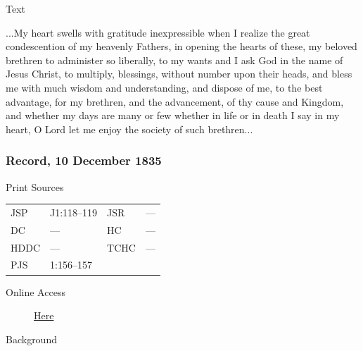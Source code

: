 			\begin{description}
				\item[Text]
			\end{description}
			
				...My heart swells with gratitude inexpressible when I realize the great condescention of my heavenly Fathers, in opening the hearts of these, my beloved brethren to administer so liberally, to my wants and I ask God in the name of Jesus Christ, to multiply, blessings, without number upon their heads, and bless me with much wisdom and understanding, and dispose of me, to the best advantage, for my brethren, and the advancement, of thy cause and Kingdom, and whether my days are many or few whether in life or in death I say in my heart, O Lord let me enjoy the society of such brethren...
				
		\subsubsection{Record, 10 December 1835}
			\label{EMS-1835-JS-10-DEC-1835}
			
			\begin{description}
				\item[Print Sources]
			\end{description}

				\begin{tabular}{p{0.5in}p{1in}p{0.5in}p{1in}}
				JSP	 	& J1:118--119		& JSR 		& --- \\
				DC	 	& --- 				& HC 		& --- \\
				HDDC 	& ---				& TCHC 		& --- \\
				PJS 	& 1:156--157			& 	 		&  \\
				\end{tabular}
			
			\begin{description}
				\item[Online Access] \href{https://www.josephsmithpapers.org/paper-summary/journal-1835-1836/61}{Here}
			\end{description}
			
			\begin{description}
				\item[Background]
			\end{description}
			
